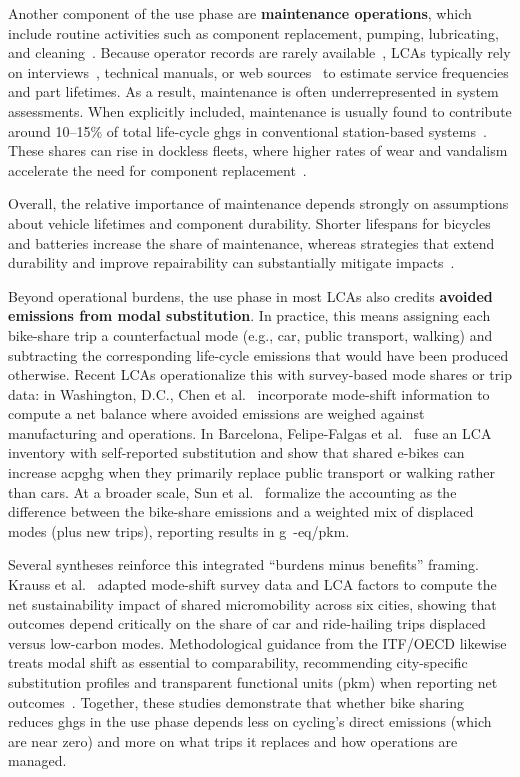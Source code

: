         Another component of the use phase are \textbf{maintenance operations}, which include routine activities such as component replacement, pumping, lubricating, and cleaning~\cite{Zhu2023}. Because operator records are rarely available~\cite{Calan2024}, LCAs typically rely on interviews~\cite{Zhu2023}, technical manuals, or web sources~\cite{Bonilla-Alicea2020} to estimate service frequencies and part lifetimes. As a result, maintenance is often underrepresented in system assessments. When explicitly included, maintenance is usually found to contribute around 10–15\% of total life-cycle \acp{ghg} in conventional station-based systems~\cite{Sun2022, Chen2024, deBortoli2021Environmental}. These shares can rise in dockless fleets, where higher rates of wear and vandalism accelerate the need for component replacement~\cite{Luo2019}.

        Overall, the relative importance of maintenance depends strongly on assumptions about vehicle lifetimes and component durability. Shorter lifespans for bicycles and batteries increase the share of maintenance, whereas strategies that extend durability and improve repairability can substantially mitigate impacts~\cite{Zhu2023, Calan2024}.      

        Beyond operational burdens, the use phase in most LCAs also credits \textbf{avoided emissions from modal substitution}. In practice, this means assigning each bike-share trip a counterfactual mode (e.g., car, public transport, walking) and subtracting the corresponding life-cycle emissions that would have been produced otherwise. Recent LCAs operationalize this with survey-based mode shares or trip data: in Washington, D.C., Chen et al.~\cite{Chen2024} incorporate mode-shift information to compute a net balance where avoided emissions are weighed against manufacturing and operations. In Barcelona, Felipe-Falgas et al.~\cite{Felipe-Falgas2022} fuse an LCA inventory with self-reported substitution and show that shared e-bikes can increase acp{ghg} when they primarily replace public transport or walking rather than cars. At a broader scale, Sun et al.~\cite{Sun2022} formalize the accounting as the difference between the bike-share emissions and a weighted mix of displaced modes (plus new trips), reporting results in g~-eq/pkm.

        Several syntheses reinforce this integrated “burdens minus benefits” framing. Krauss et al.~\cite{Krauss2022} adapted mode-shift survey data and LCA factors to compute the net sustainability impact of shared micromobility across six cities, showing that outcomes depend critically on the share of car and ride-hailing trips displaced versus low-carbon modes. Methodological guidance from the ITF/OECD likewise treats modal shift as essential to comparability, recommending city-specific substitution profiles and transparent functional units (pkm) when reporting net outcomes~\cite{Cazzola2020}. Together, these studies demonstrate that whether bike sharing reduces \acp{ghg} in the use phase depends less on cycling’s direct emissions (which are near zero) and more on what trips it replaces and how operations are managed.

